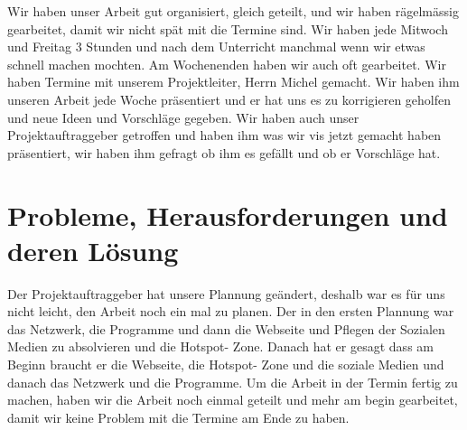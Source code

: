 Wir haben unser Arbeit gut organisiert, gleich geteilt, und wir haben r\"agelm\"assig gearbeitet, damit wir nicht sp\"at mit die Termine sind. Wir haben jede Mitwoch und Freitag 3 Stunden und nach dem Unterricht manchmal wenn wir etwas schnell machen mochten. Am Wochenenden haben wir auch oft gearbeitet. 
Wir haben Termine mit unserem Projektleiter, Herrn Michel gemacht. Wir haben ihm unseren Arbeit jede Woche pr\"asentiert und er hat uns es zu korrigieren geholfen und neue Ideen und Vorschl\"age gegeben.
Wir haben auch unser Projektauftraggeber getroffen und haben ihm was wir vis jetzt gemacht haben pr\"asentiert, wir haben ihm gefragt ob ihm es gef\"allt und ob er Vorschl\"age hat.
  
\section{Probleme, Herausforderungen und deren L\"osung}

Der Projektauftraggeber hat unsere Plannung ge\"andert, deshalb war es f\"ur uns nicht leicht, den Arbeit noch ein mal zu planen. Der in den ersten Plannung war das Netzwerk, die Programme und dann die Webseite und Pflegen der Sozialen Medien zu absolvieren und die Hotspot- Zone. Danach hat er gesagt dass am Beginn braucht er die Webseite, die Hotspot- Zone und die soziale Medien und danach das Netzwerk und die Programme. Um die Arbeit in der Termin fertig zu machen, haben wir die Arbeit noch einmal geteilt und mehr am begin gearbeitet, damit wir keine Problem mit die Termine am Ende zu haben. 
